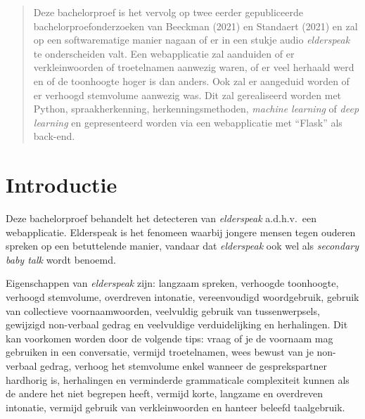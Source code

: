 \documentclass[a0,portrait]{a0poster}
\begin{document}
\begin{multicols}{2} %


\color{HoGentAccent1} %

\begin{abstract}
Deze bachelorproef is het vervolg op twee eerder gepubliceerde bachelorproefonderzoeken van Beeckman (2021) en Standaert (2021) en zal op een softwarematige manier nagaan of er in een stukje audio \textit{elderspeak} te onderscheiden valt. Een webapplicatie zal aanduiden of er verkleinwoorden of troetelnamen aanwezig waren, of er veel herhaald werd en of de toonhoogte hoger is dan anders. Ook zal er aangeduid worden of er verhoogd stemvolume aanwezig was. Dit zal gerealiseerd worden met Python, spraakherkenning, herkenningsmethoden, \textit{machine learning} of \textit{deep learning} en gepresenteerd worden via een webapplicatie met ``Flask'' als back-end.
\end{abstract}
\vspace{1cm}

\color{HoGentAccent1}
\section*{Introductie}
\color{black}
\color{black}
Deze bachelorproef behandelt het detecteren van \textit{elderspeak} a.d.h.v.\ een webapplicatie. Elderspeak is het fenomeen waarbij jongere mensen tegen ouderen spreken op een betuttelende manier, vandaar dat \textit{elderspeak} ook wel als \textit{secondary baby talk} wordt benoemd.

\newline
Eigenschappen van \textit{elderspeak} zijn: langzaam spreken, verhoogde toonhoogte, verhoogd stemvolume, overdreven intonatie, vereenvoudigd woordgebruik, gebruik van collectieve voornaamwoorden, veelvuldig gebruik van tussenwerpsels, gewijzigd non-verbaal gedrag en veelvuldige verduidelijking en herhalingen. Dit kan voorkomen worden door de volgende tips: vraag of je de voornaam mag gebruiken in een conversatie, vermijd troetelnamen, wees bewust van je non-verbaal gedrag, verhoog het stemvolume enkel wanneer de gesprekspartner hardhorig is, herhalingen en verminderde grammaticale complexiteit kunnen als de andere het niet begrepen heeft, vermijd korte, langzame en overdreven intonatie, vermijd gebruik van verkleinwoorden en hanteer beleefd taalgebruik.



\end{multicols}
\end{document}
